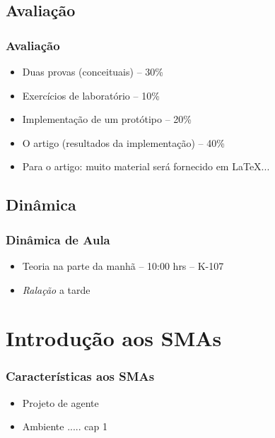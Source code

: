 \documentclass[10pt]{beamer}
\begin{document}
\subsection{Avaliação}
\begin{frame}

    \frametitle{Avaliação}

    \begin{itemize}
      \item Duas provas (conceituais) -- 30\%
      \item Exercícios de laboratório  -- 10\%
      \item Implementação de um protótipo  -- 20\%
      \item O artigo (resultados da implementação)  -- 40\%
      \item Para o artigo: muito material será fornecido em \LaTeX ...
       
      
    \end{itemize}
\end{frame}



\subsection{Dinâmica}
\begin{frame}

    \frametitle{Dinâmica de Aula}

    \begin{itemize}
      \item Teoria na parte da manhã -- 10:00 hrs -- K-107
      \item \textit{Ralação} a tarde
      
    \end{itemize}
\end{frame}



\section{Introdução aos SMAs}
\begin{frame}

    \frametitle{Características aos SMAs}
    \begin{itemize}
    \pause
      \item Projeto de agente
\pause
      \item Ambiente
      ..... cap 1
    
    \end{itemize}
\end{frame}
\end{document}
